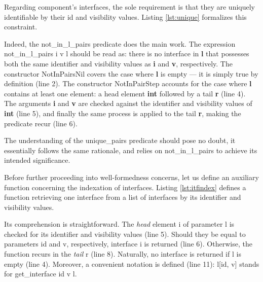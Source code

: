 	
		Regarding \textsf{component}'s \textsf{interface}s, the sole requirement is that they are uniquely identifiable
	by their \textsf{id} and \textsf{visibility} values. Listing \ref{lst:unique} formalizes
	this constraint.			
	
	
	
	\noindent Indeed, the \textsf{not\_in\_l\_pairs} predicate does the main work.
	The expression \textsf{not\_in\_l\_pairs i v l} should be read as: there is no
	\textsf{interface} in \textbf{l} that possesses both the same identifier and
	visibility values as \textbf{i} and \textbf{v}, respectively.	
	The constructor \textsf{NotInPairsNil} covers the case where \textbf{l}
	is empty --- it is simply true by definition (line 2). 
	The constructor \textsf{NotInPairStep} accounts for the case where \textbf{l}
	contains at least one element: a head element \textbf{int} 
	followed by a tail \textbf{r} (line 4). 	
	The arguments \textbf{i} and \textbf{v} are checked against the identifier and
	\textsf{visibility} values of \textbf{int} (line 5), and finally the same process is applied to
	the tail \textbf{r}, making the predicate recur (line 6).
	
		The understanding of the \textsf{unique\_pairs} predicate should pose no doubt, it
	essentially follows the same rationale, and relies on \textsf{not\_in\_l\_pairs} to achieve
	its intended significance.


		Before further proceeding into well-formedness concerns, let us define an auxiliary function
	concerning the indexation of \textsf{interface}s. Listing \ref{lst:itfindex} defines a function
	retrieving one \textsf{interface} from a list of \textsf{interface}s by its identifier and
	\textsf{visibility} values.



	\noindent Its comprehension is straightforward. The \textit{head} element \textsf{i}
	of parameter \textsf{l} is checked for its identifier and \textsf{visibility} values (line 5). 
	Should they be equal to parameters \textsf{id} and \textsf{v}, respectively, 
   \textsf{interface} \textsf{i} is returned (line 6). Otherwise,
   the function recurs in the \textit{tail} \textsf{r} (line 8). Naturally, no \textsf{interface} is returned if 
   \textsf{l} is empty (line 4). Moreover, a convenient notation is defined (line 11): \textsf{l[id, v]} stands
   for \textsf{get\_interface id v l}.
   
